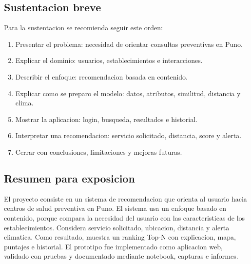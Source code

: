 \documentclass[12pt,a4paper]{article}
\begin{document}
\subsection{Sustentacion breve}
Para la sustentacion se recomienda seguir este orden:

\begin{enumerate}[leftmargin=*]
  \item Presentar el problema: necesidad de orientar consultas preventivas en Puno.
  \item Explicar el dominio: usuarios, establecimientos e interacciones.
  \item Describir el enfoque: recomendacion basada en contenido.
  \item Explicar como se preparo el modelo: datos, atributos, similitud, distancia y clima.
  \item Mostrar la aplicacion: login, busqueda, resultados e historial.
  \item Interpretar una recomendacion: servicio solicitado, distancia, score y alerta.
  \item Cerrar con conclusiones, limitaciones y mejoras futuras.
\end{enumerate}

\subsection{Resumen para exposicion}
El proyecto consiste en un sistema de recomendacion que orienta al usuario hacia centros de salud preventiva en Puno. El sistema usa un enfoque basado en contenido, porque compara la necesidad del usuario con las caracteristicas de los establecimientos. Considera servicio solicitado, ubicacion, distancia y alerta climatica. Como resultado, muestra un ranking Top-N con explicacion, mapa, puntajes e historial. El prototipo fue implementado como aplicacion web, validado con pruebas y documentado mediante notebook, capturas e informes.
\end{document}
